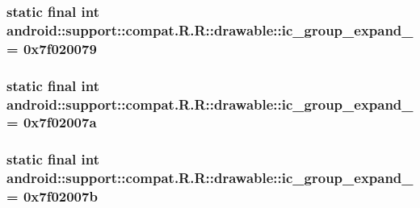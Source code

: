 \hypertarget{classandroid_1_1support_1_1compat_1_1_r_1_1drawable_a5a8368bd67be02f9bb0d7b4ad19e113}{
\subsubsection[{ic\_\-group\_\-expand\_\-10}]{\setlength{\rightskip}{0pt plus 5cm}static final int android::support::compat.R.R::drawable::ic\_\-group\_\-expand\_ = 0x7f020079}}
\label{classandroid_1_1support_1_1compat_1_1_r_1_1drawable_a5a8368bd67be02f9bb0d7b4ad19e113}


\hypertarget{classandroid_1_1support_1_1compat_1_1_r_1_1drawable_c586542089795048d75e0ee7b1716aa0}{
\subsubsection[{ic\_\-group\_\-expand\_\-11}]{\setlength{\rightskip}{0pt plus 5cm}static final int android::support::compat.R.R::drawable::ic\_\-group\_\-expand\_ = 0x7f02007a}}
\label{classandroid_1_1support_1_1compat_1_1_r_1_1drawable_c586542089795048d75e0ee7b1716aa0}


\hypertarget{classandroid_1_1support_1_1compat_1_1_r_1_1drawable_5575636ca28ff63ebdbe5bb455660119}{
\subsubsection[{ic\_\-group\_\-expand\_\-12}]{\setlength{\rightskip}{0pt plus 5cm}static final int android::support::compat.R.R::drawable::ic\_\-group\_\-expand\_ = 0x7f02007b}}
\label{classandroid_1_1support_1_1compat_1_1_r_1_1drawable_5575636ca28ff63ebdbe5bb455660119}


